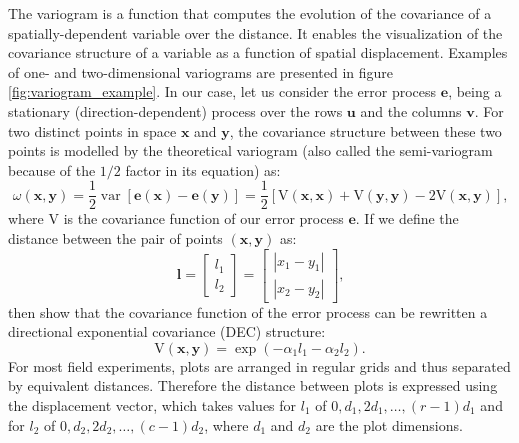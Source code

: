 The variogram is a function that computes the evolution of the covariance of a spatially-dependent variable over the distance.
It enables the visualization of the covariance structure of a variable as a function of spatial displacement. Examples of one- and two-dimensional variograms are presented in figure \ref{fig:variogram_example}. In our case, let us consider the error process $\mathbf{e}$, being a stationary (direction-dependent) process over the rows $\boldsymbol{u}$ and the columns $\boldsymbol{v}$. For two distinct points in space $\boldsymbol{x}$ and $\boldsymbol{y}$, the covariance structure between these two points is modelled by the theoretical variogram (also called the semi-variogram because of the $1/2$ factor in its equation) as:
\begin{equation}
    \omega(\boldsymbol{x}, \boldsymbol{y})=\frac{1}{2} \operatorname{var}[\mathbf{e}(\boldsymbol{x})-\mathbf{e}(\boldsymbol{y})]=\frac{1}{2}
    [\mathrm{V}(\boldsymbol{x}, \boldsymbol{x})+\mathrm{V}(\boldsymbol{y}, \boldsymbol{y})-2 \mathrm{V}(\boldsymbol{x}, \boldsymbol{y})]
    \text{,}
\end{equation}
where $\mathrm{V}$ is the covariance function of our error process $\mathbf{e}$. If we define the distance between the pair of points $(\mathbf{x},\mathbf{y})$ as:
\begin{equation*}
    \mathbf{l}=\left[ \begin{array}{l}{l_{1}} \\ {l_{2}}\end{array}\right]=\left[ \begin{array}{l}{\left|x_{1}-y_{1}\right|} \\ 
    {\left|x_{2}-y_{2}\right|}\end{array}\right]
    \text{,}
\end{equation*}
then \textcite{zimmerman_random_1991} show that the covariance function of the error process can be rewritten a directional exponential covariance (DEC) structure:
\begin{equation}
	\mathrm{V}(\boldsymbol{x},\boldsymbol{y}) = \operatorname{exp}(-\alpha_{1}l_{1} - \alpha_{2}l_{2})
	\text{.}
\end{equation}
For most field experiments, plots are arranged in regular grids and thus separated by equivalent distances. Therefore the distance between plots is expressed using the displacement vector, which takes values for $l_1$ of $0,d_1,2d_1,\ldots,(r-1)d_1$ and for $l_2$ of $0,d_2,2d_2,\ldots,(c-1)d_2$, where $d_1$ and $d_2$ are the plot dimensions. 
